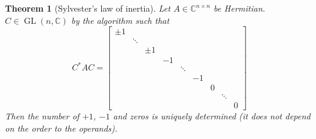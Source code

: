 \documentclass{article}
\newcounter{lecref}[section]
\numberwithin{lecref}{section}
\newtheorem{theorem}[lecref]{Theorem}
\begin{document}
\begin{theorem}[Sylvester's law of inertia]
  Let $A \in \mathbb C^{n\times n}$ be Hermitian.
  $C \in \operatorname{GL}(n, \mathbb C)$ by the algorithm
  such that
  \[ C^* AC = \begin{bmatrix}
    \pm 1 &        &       &    &        &    &   &        & \\
          & \ddots &       &    &        &    &   &        & \\
          &        & \pm 1 &    &        &    &   &        & \\
          &        &       & -1 &        &    &   &        & \\
          &        &       &    & \ddots &    &   &        & \\
          &        &       &    &        & -1 &   &        & \\
          &        &       &    &        &    & 0 &        & \\
          &        &       &    &        &    &   & \ddots & \\
          &        &       &    &        &    &   &        & 0
    \end{bmatrix}
  \]
  Then the number of $+1$, $-1$ and zeros is uniquely determined
  (it does not depend on the order to the operands).
\end{theorem}
\end{document}
